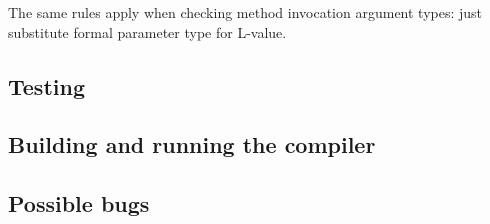 \documentclass[a4paper,11pt]{article}
\begin{document}
The same rules apply when checking method invocation argument types: just substitute formal parameter type for L-value.


\subsection{Testing}

\subsection{Building and running the compiler}

\subsection{Possible bugs}
\end{document}
